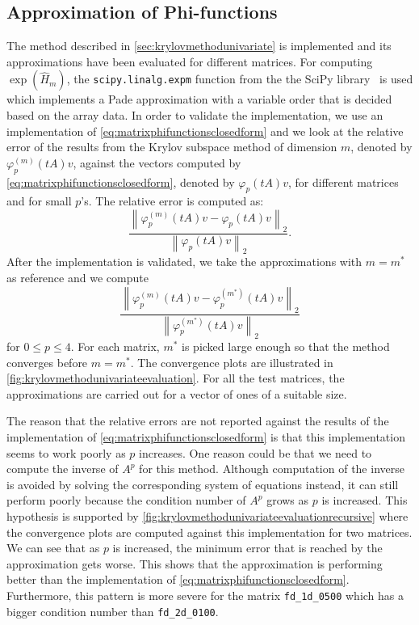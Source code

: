 \subsection{Approximation of Phi-functions}
The method described in \autoref{sec:krylovmethodunivariate} is implemented and its approximations have been evaluated
for different matrices.
For computing $\exp(\hat{H}_m)$, the \texttt{scipy.linalg.expm} function from the the SciPy library~\cite{SciPy2020}
is used which implements a Pade approximation with a variable order that is decided based on the array data.
In order to validate the implementation, we use an implementation of \eqref{eq:matrixphifunctionsclosedform}
and we look at the relative error of the results from the Krylov subspace method of dimension $m$, denoted by
$\varphi_p^{(m)}(tA)v$, against the vectors computed by \eqref{eq:matrixphifunctionsclosedform},
denoted by $\varphi_p(tA)v$, for different matrices and for small $p$'s. The relative error is computed as:
\begin{equation*}
    \frac{\left\| \varphi_p^{(m)}(tA)v - \varphi_p(tA)v \right\|_2}{\left\| \varphi_p(tA)v\right\|_2}.
\end{equation*}
After the implementation is validated, we take the approximations with $m=m^*$ as reference and we compute
\begin{equation*}
    \frac{\left\| \varphi_p^{(m)}(tA)v - \varphi_p^{(m^*)}(tA)v \right\|_2}{\left\| \varphi_p^{(m^*)}(tA)v\right\|_2}
\end{equation*}
for $0 \le p \le 4$. For each matrix, $m^*$ is picked large enough so that the method converges before $m=m^*$.
The convergence plots are illustrated in \autoref{fig:krylovmethodunivariateevaluation}.
For all the test matrices, the approximations are carried out for a vector of ones of a suitable size.

\begin{remark}
    The reason that the relative errors are not reported against the results of the implementation of
    \eqref{eq:matrixphifunctionsclosedform} is that this implementation seems to work poorly as $p$ increases.
    One reason could be that we need to compute the inverse of $A^p$ for this method. Although computation of the
    inverse is avoided by solving the corresponding system of equations instead, it can still perform poorly because
    the condition number of $A^p$ grows as $p$ is increased. This hypothesis is supported by
    \autoref{fig:krylovmethodunivariateevaluationrecursive} where the convergence plots are computed against this implementation
    for two matrices. We can see that as $p$ is increased, the minimum error that is reached by the approximation gets worse.
    This shows that the approximation is performing better than the implementation of \eqref{eq:matrixphifunctionsclosedform}.
    Furthermore, this pattern is more severe for the matrix \texttt{fd\_1d\_0500} which has a bigger condition number
    than \texttt{fd\_2d\_0100}.
\end{remark}

